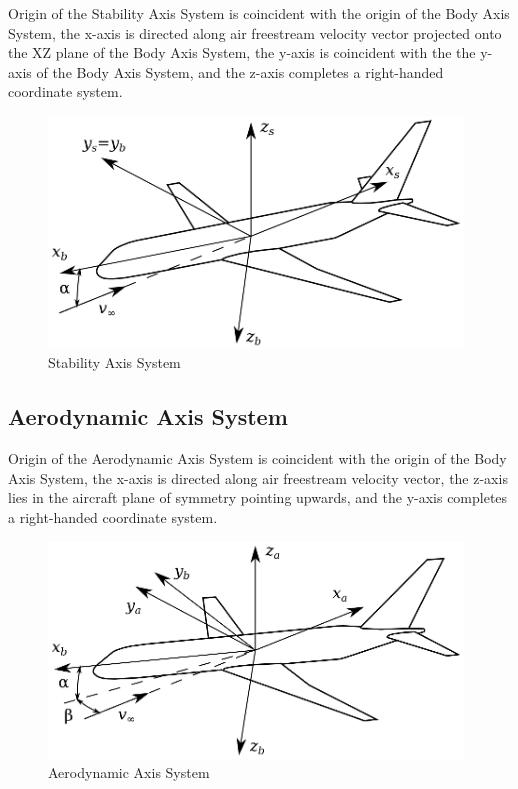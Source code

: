 Origin of the Stability Axis System is coincident with the origin of the Body Axis System, the x\nobreakdash-axis is directed along air freestream velocity vector projected onto the XZ plane of the Body Axis System, the y\nobreakdash-axis is coincident with the the y\nobreakdash-axis of the Body Axis System, and the z\nobreakdash-axis completes a right-handed coordinate system.

\begin{figure}
  \centering
  \includegraphics[width=110mm]{images/coordinate_system_Stab.eps}
  \caption{Stability Axis System}
\end{figure}

\subsection{Aerodynamic Axis System}

Origin of the Aerodynamic Axis System is coincident with the origin of the Body Axis System, the x\nobreakdash-axis is directed along air freestream velocity vector, the z\nobreakdash-axis lies in the aircraft plane of symmetry pointing upwards, and the y\nobreakdash-axis completes a right-handed coordinate system.

\begin{figure}
  \centering
  \includegraphics[width=110mm]{images/coordinate_system_Aero.eps}
  \caption{Aerodynamic Axis System}
\end{figure}


